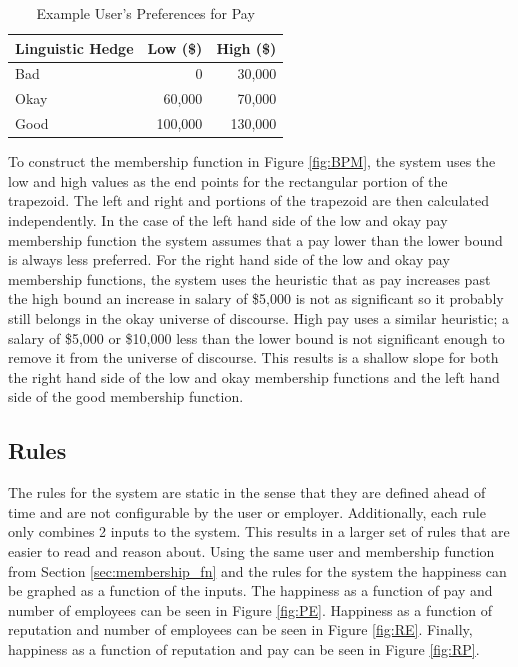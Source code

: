 \documentclass[12pt,fleqn,reqno,letterpaper]{article}
\begin{document}
\begin{table}[H]
  \caption{Example User’s Preferences for Pay}
  \label{tbl:USER-PAY-PREF}
  \centering
\begin{tabular}{|l|r|r|}
\hline
\textbf{Linguistic Hedge} & \textbf{Low (\$)} & \textbf{High (\$)} \\ \hline
Bad                       & 0            & 30,000         \\ \hline
Okay                      & 60,000        & 70,000         \\ \hline
Good                      & 100,000       & 130,000        \\ \hline
\end{tabular}
\end{table}
To construct the membership function in Figure \ref{fig:BPM}, the system uses the low and high values as the end points for the rectangular portion of the trapezoid. The left and right and portions of the trapezoid are then calculated independently. In the case of the left hand side of the low and okay pay membership function the system assumes that a pay lower than the lower bound is always less preferred. For the right hand side of the low and okay pay membership functions, the system uses the heuristic that as pay increases past the high bound an increase in salary of \$5,000 is not as significant so it probably still belongs in the okay universe of discourse. High pay uses a similar heuristic; a salary of \$5,000 or \$10,000 less than the lower bound is not significant enough to remove it from the universe of discourse. This results is a shallow slope for both the right hand side of the low and okay membership functions and the left hand side of the good membership function.

\subsection{Rules}
The rules for the system are static in the sense that they are defined ahead of time and are not configurable by the user or employer. Additionally, each rule only combines 2 inputs to the system. This results in a larger set of rules that are easier to read and reason about. Using the same user and membership function from Section \ref{sec:membership_fn} and the rules for the system the happiness can be graphed as a function of the inputs. The happiness as a function of pay and number of employees can be seen in Figure \ref{fig:PE}. Happiness as a function of reputation and number of employees can be seen in Figure \ref{fig:RE}. Finally, happiness as a function of reputation and pay can be seen in Figure \ref{fig:RP}.
\end{document}
